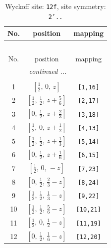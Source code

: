 \documentclass[fleqn,8pt]{jsarticle}
\begin{document}
\begin{longtable}{ccc}
\caption{Wyckoff site: {\tt 12f}, site symmetry: {\tt 2'..}}
 \\
 \hline \hline
No. & position & mapping \\ \hline \endfirsthead

\multicolumn{2}{l}{\tablename\ \thetable{}} \\
 \hline \hline
No. & position & mapping \\ \hline \endhead

 \hline \hline
\multicolumn{2}{r}{\footnotesize\it continued ...} \\ \endfoot

 \hline \hline
\multicolumn{2}{r}{} \\ \endlastfoot

1 & $\left[ \frac{1}{2},\, 0,\, z \right]$ & {\tt [1,16]} \\ \hline
2 & $\left[ \frac{1}{2},\, \frac{1}{2},\, z + \frac{5}{6} \right]$ & {\tt [2,17]} \\ \hline
3 & $\left[ 0,\, \frac{1}{2},\, z + \frac{2}{3} \right]$ & {\tt [3,18]} \\ \hline
4 & $\left[ \frac{1}{2},\, 0,\, z + \frac{1}{2} \right]$ & {\tt [4,13]} \\ \hline
5 & $\left[ \frac{1}{2},\, \frac{1}{2},\, z + \frac{1}{3} \right]$ & {\tt [5,14]} \\ \hline
6 & $\left[ 0,\, \frac{1}{2},\, z + \frac{1}{6} \right]$ & {\tt [6,15]} \\ \hline
7 & $\left[ \frac{1}{2},\, 0,\, - z \right]$ & {\tt [7,23]} \\ \hline
8 & $\left[ 0,\, \frac{1}{2},\, \frac{2}{3} - z \right]$ & {\tt [8,24]} \\ \hline
9 & $\left[ \frac{1}{2},\, \frac{1}{2},\, \frac{1}{3} - z \right]$ & {\tt [9,22]} \\ \hline
10 & $\left[ \frac{1}{2},\, \frac{1}{2},\, \frac{5}{6} - z \right]$ & {\tt [10,21]} \\ \hline
11 & $\left[ \frac{1}{2},\, 0,\, \frac{1}{2} - z \right]$ & {\tt [11,19]} \\ \hline
12 & $\left[ 0,\, \frac{1}{2},\, \frac{1}{6} - z \right]$ & {\tt [12,20]} \\
\end{longtable}
\renewcommand{\arraystretch}{1.2}
\end{document}
